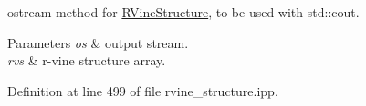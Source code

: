 ostream method for \hyperlink{classvinecopulib_1_1_r_vine_structure}{R\+Vine\+Structure}, to be used with {\ttfamily std\+::cout}. 


\begin{DoxyParams}{Parameters}
{\em os} & output stream. \\
\hline
{\em rvs} & r-\/vine structure array. \\
\hline
\end{DoxyParams}


Definition at line 499 of file rvine\+\_\+structure.\+ipp.

